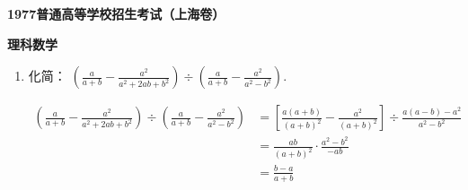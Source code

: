 \documentclass[answers]{exam}
\begin{document}
\begin{center}
	\textbf{1977普通高等学校招生考试（上海卷）}

	\textbf{\Huge 理科数学}
\end{center}
\begin{questions}
	\question
	\begin{enumerate}[label=(\arabic*)]
		\item 化简：
		      \begin{math} \displaystyle
			      \left(\frac{a}{a+b} - \frac{a^2}{a^2 + 2ab + b^2}\right) \div \left(\frac{a}{a+b} - \frac{a^2}{a^2 - b^2}\right)
		      \end{math}.
		      \begin{solution}
			      \begin{align*}
				      \left(\frac{a}{a+b} - \frac{a^2}{a^2 + 2ab + b^2}\right) \div \left(\frac{a}{a+b} - \frac{a^2}{a^2 - b^2}\right)
				       & = \left[ \frac{a(a+b)}{(a+b)^2} - \frac{a^2}{(a+b)^2} \right] \div \frac{a(a-b) - a^2}{a^2-b^2}
				      \\
				       & = \frac{ab}{(a+b)^2} \cdot \frac{a^2 - b^2}{-ab}                                                \\
				       & = \frac{b-a}{a+b}
			      \end{align*}
		      \end{solution}

	\end{enumerate}

\end{questions}
\end{document}
